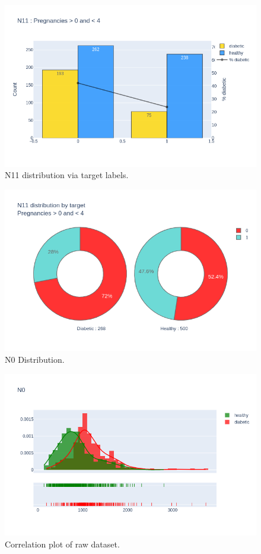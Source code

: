 \documentclass[12pt]{article}
\begin{document}
\begin{figure}[ht]
\centering
\includegraphics[width=1\textwidth]{newplot(37).png}
\caption{N11 distribution via target labels.}
\end{figure}

\begin{figure}[ht]
\centering
\includegraphics[width=1\textwidth]{newplot(38).png}
\caption{N0 Distribution.}
\end{figure}

\begin{figure}[ht]
\centering
\includegraphics[width=1\textwidth]{newplot(39).png}
\caption{Correlation plot of raw dataset.}
\end{figure}
\end{document}
